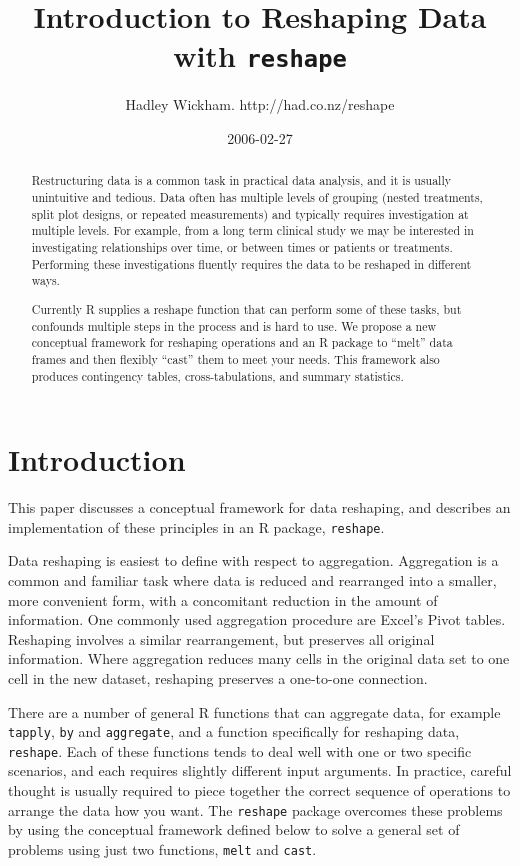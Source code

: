 \documentclass[]{article}
\title{Introduction to Reshaping Data with \texttt{reshape}}
\author{Hadley Wickham. http://had.co.nz/reshape}
\date{2006-02-27}
\begin{document}
\maketitle

\begin{abstract}

Restructuring data is a common task in practical data analysis, and it is usually unintuitive and tedious. Data often has multiple levels of grouping (nested treatments, split plot designs, or repeated measurements) and typically requires investigation at multiple levels. For example, from a long term clinical study we may be interested in investigating relationships over time, or between times or patients or treatments.  Performing these investigations fluently requires the data to be reshaped in different ways.

Currently R supplies a reshape function that can perform some of these tasks, but confounds multiple steps in the process and is hard to use.  We propose a new conceptual framework for reshaping operations and an R package to ``melt'' data frames and then flexibly ``cast'' them to meet your needs. This framework also produces contingency tables, cross-tabulations, and summary statistics.

\end{abstract}

\section{Introduction}

This paper discusses a conceptual framework for data reshaping, and describes an implementation of these principles in an R package, \texttt{reshape}.  

Data reshaping is easiest to define with respect to aggregation.  Aggregation is a common and familiar task where data is reduced and rearranged into a smaller, more convenient form, with a concomitant reduction in the amount of information.  One commonly used aggregation procedure are Excel's Pivot tables.  Reshaping involves a similar rearrangement, but preserves all original information.  Where aggregation reduces many cells in the original data set to one cell in the new dataset, reshaping preserves a one-to-one connection.  

There are a number of general R functions that can aggregate data, for example \texttt{tapply}, \texttt{by} and \texttt{aggregate}, and a function specifically for reshaping data, \texttt{reshape}.  Each of these functions tends to deal well with one or two specific scenarios, and each requires slightly different input arguments.  In practice, careful thought is usually required to piece together the correct sequence of operations to arrange the data how you want.  The \texttt{reshape} package overcomes these problems by using the conceptual framework defined below to solve a general set of problems using just two functions, \texttt{melt} and \texttt{cast}.  
\end{document}
